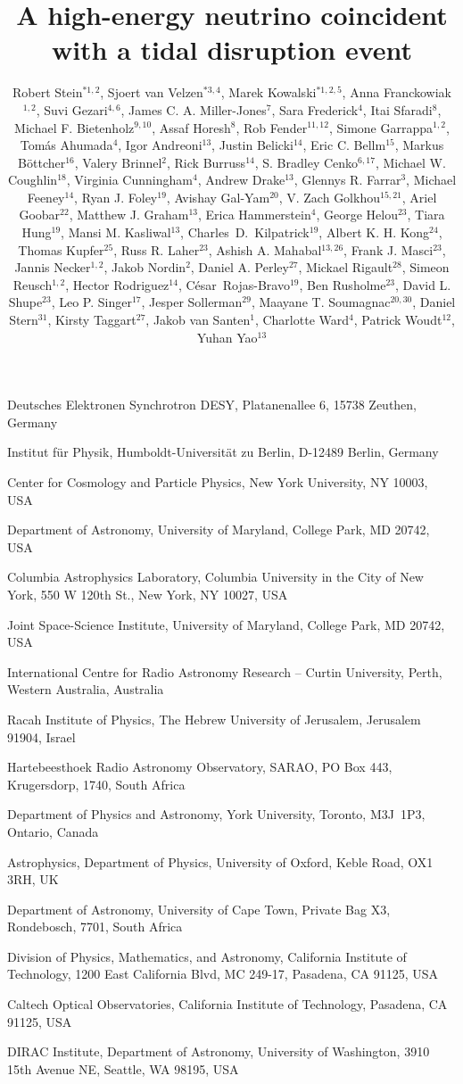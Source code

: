 \documentclass{nature_plusfigure}
\title{A high-energy neutrino coincident with a tidal disruption event}
\author{Robert Stein$^{*1, 2}$,
	Sjoert van Velzen$^{*3, 4}$, 
	Marek Kowalski$^{*1, 2, 5}$,
	Anna Franckowiak$^{1, 2}$,
	Suvi Gezari$^{4, 6}$,
	James C. A. Miller-Jones$^{7}$,
	Sara Frederick$^{4}$,
	Itai Sfaradi$^{8}$,
	Michael F. Bietenholz$^{9, 10}$,
	Assaf Horesh$^{8}$,
	Rob Fender$^{11,12}$,
	Simone Garrappa$^{1,2}$,
	Tom\'as Ahumada$^{4}$,
	Igor Andreoni$^{13}$,
	Justin Belicki$^{14}$,
	Eric C. Bellm$^{15}$,
	Markus B\"ottcher$^{16}$,
	Valery Brinnel$^{2}$,
	Rick Burruss$^{14}$,
	S. Bradley Cenko$^{6,17}$,
    Michael W. Coughlin$^{18}$,
	Virginia Cunningham$^{4}$,
	Andrew Drake$^{13}$,
	Glennys R. Farrar$^{3}$,
	Michael Feeney$^{14}$,
	Ryan J. Foley$^{19}$,
	Avishay Gal-Yam$^{20}$,
	V. Zach Golkhou$^{15,21}$,
	Ariel Goobar$^{22}$,
	Matthew J. Graham$^{13}$,
	Erica Hammerstein$^{4}$,
	George Helou$^{23}$,
	Tiara Hung$^{19}$,
	Mansi M. Kasliwal$^{13}$,
	Charles~D.~Kilpatrick$^{19}$,
	Albert K. H. Kong$^{24}$,
	Thomas Kupfer$^{25}$,
	Russ R. Laher$^{23}$,
	Ashish A. Mahabal$^{13,26}$,
	Frank J. Masci$^{23}$,
	Jannis Necker$^{1,2}$,
	Jakob Nordin$^{2}$,
	Daniel A. Perley$^{27}$,
	Mickael Rigault$^{28}$,
	Simeon Reusch$^{1,2}$,
	Hector Rodriguez$^{14}$,
	C\'{e}sar~Rojas-Bravo$^{19}$,
	Ben Rusholme$^{23}$,
	David L. Shupe$^{23}$,
	Leo P. Singer$^{17}$,
	Jesper Sollerman$^{29}$,
	Maayane T. Soumagnac$^{20,30}$,
	Daniel Stern$^{31}$,
	Kirsty Taggart$^{27}$,
	Jakob van Santen$^{1}$,
	Charlotte Ward$^{4}$,
	Patrick Woudt$^{12}$,
	Yuhan Yao$^{13}$
	}
\begin{document}
\maketitle

\begin{affiliations}
 \item {Deutsches Elektronen Synchrotron DESY, Platanenallee 6, 15738 Zeuthen, Germany}
 \item {Institut f{\"u}r Physik, Humboldt-Universit{\"a}t zu Berlin, D-12489 Berlin, Germany}
\item Center for Cosmology and Particle Physics, New York University, NY 10003, USA
\item Department of Astronomy, University of Maryland, College Park, MD 20742, USA
\item {Columbia Astrophysics Laboratory, Columbia University in the City of New York, 550 W 120th St., New York, NY 10027, USA}
 \item Joint Space-Science Institute, University of Maryland, College Park, MD 20742, USA
 \item International Centre for Radio Astronomy Research -- Curtin University, Perth, Western Australia, Australia
 \item {Racah Institute of Physics, The Hebrew University of Jerusalem, Jerusalem 91904, Israel} %
 \item{Hartebeesthoek Radio Astronomy Observatory, SARAO, PO Box 443, Krugersdorp, 1740, South Africa }
 \item{Department of Physics and Astronomy, York University, Toronto, M3J~1P3, Ontario, Canada}
\item Astrophysics, Department of Physics, University of Oxford, Keble Road, OX1 3RH, UK
\item Department of Astronomy, University of Cape Town, Private Bag X3, Rondebosch, 7701, South
Africa
\item {Division of Physics, Mathematics, and Astronomy, California Institute of Technology, 1200 East California Blvd, MC 249-17, Pasadena, CA 91125, USA}
\item{Caltech Optical Observatories, California Institute of Technology, Pasadena, CA  91125, USA}
\item{DIRAC Institute, Department of Astronomy, University of Washington, 3910 15th Avenue NE, Seattle, WA 98195, USA}

\end{affiliations}
\end{document}

